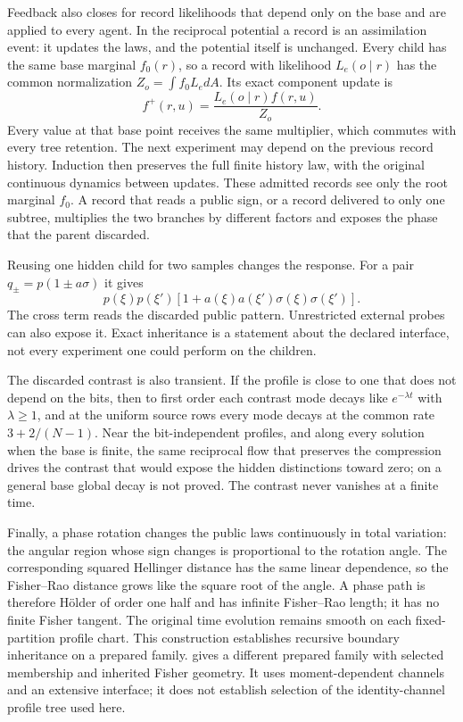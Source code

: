 Feedback also closes for record likelihoods that depend only on the base and are applied to every agent. In the reciprocal potential a record is an assimilation event: it updates the laws, and the potential itself is unchanged. Every child has the same base marginal $f_0(r)$, so a record with likelihood $L_e(o\mid r)$ has the common normalization $Z_o=\int f_0L_e dA$. Its exact component update is
\begin{equation}
 f^+(r,u)=\frac{L_e(o\mid r)f(r,u)}{Z_o}.
\end{equation}
Every value at that base point receives the same multiplier, which commutes with every tree retention. The next experiment may depend on the previous record history. Induction then preserves the full finite history law, with the original continuous dynamics between updates. These admitted records see only the root marginal $f_0$. A record that reads a public sign, or a record delivered to only one subtree, multiplies the two branches by different factors and exposes the phase that the parent discarded.

Reusing one hidden child for two samples changes the response. For a pair $q_\pm=p(1\pm a\sigma)$ it gives
\begin{equation}
 p(\xi)p(\xi')[1+a(\xi)a(\xi')\sigma(\xi)\sigma(\xi')].
\end{equation}
The cross term reads the discarded public pattern. Unrestricted external probes can also expose it. Exact inheritance is a statement about the declared interface, not every experiment one could perform on the children.

The discarded contrast is also transient. If the profile is close to one that does not depend on the bits, then to first order each contrast mode decays like $e^{-\lambda t}$ with $\lambda\ge1$, and at the uniform source rows every mode decays at the common rate $3+2/(N-1)$. Near the bit-independent profiles, and along every solution when the base is finite, the same reciprocal flow that preserves the compression drives the contrast that would expose the hidden distinctions toward zero; on a general base global decay is not proved. The contrast never vanishes at a finite time.

Finally, a phase rotation changes the public laws continuously in total variation: the angular region whose sign changes is proportional to the rotation angle. The corresponding squared Hellinger distance has the same linear dependence, so the Fisher--Rao distance grows like the square root of the angle. A phase path is therefore H\"older of order one half and has infinite Fisher--Rao length; it has no finite Fisher tangent. The original time evolution remains smooth on each fixed-partition profile chart. This construction establishes recursive boundary inheritance on a prepared family.  gives a different prepared family with selected membership and inherited Fisher geometry. It uses moment-dependent channels and an extensive interface; it does not establish selection of the identity-channel profile tree used here.
